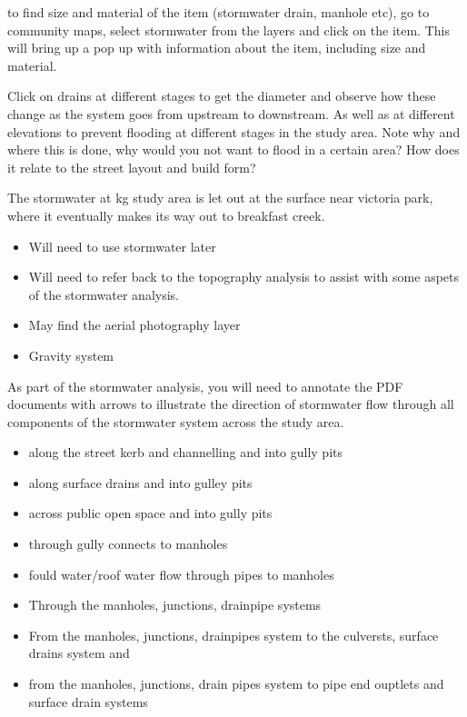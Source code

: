 \documentclass{report}
\begin{document}
	to find size and material of the item (stormwater drain, manhole etc), go to community maps, select stormwater from the layers and click on the item. This will bring up a pop up with information about the item, including size and material.

	Click on drains at different stages to get the diameter and observe how these change as the system goes from upstream to downstream. As well as at different elevations to prevent flooding at different stages in the study area. Note why and where this is done, why would you not want to flood in a certain area? How does it relate to the street layout and build form?

	The stormwater at kg study area is let out at the surface near victoria park, where it eventually makes its way out to breakfast creek. 

	\begin{itemize}
		\item Will need to use stormwater later
		\item Will need to refer back to the topography analysis to assist with some aspets of the stormwater analysis.
		\item May find the aerial photography layer
		\item Gravity system
	\end{itemize}


	As part of the stormwater analysis, you will need to annotate the PDF documents with arrows to illustrate the direction of stormwater flow through all components of the stormwater system across the study area. 

	\begin{itemize}
		\item along the street kerb and channelling and into gully pits
		\item along surface drains and into gulley pits
		\item across public open space and into gully pits
		\item through gully connects to manholes
		\item fould water/roof water flow through pipes to manholes
		\item Through the manholes, junctions, drainpipe systems
		\item From the manholes, junctions, drainpipes system to the culversts, surface drains system and
		\item from the manholes, junctions, drain pipes system to pipe end ouptlets and surface drain systems
	\end{itemize}
\end{document}
